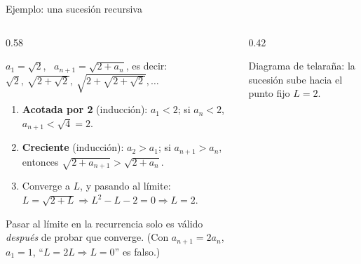 \documentclass[10pt,aspectratio=169]{beamer}
\begin{document}
\begin{frame}{Ejemplo: una sucesión recursiva}
  \begin{columns}
    \begin{column}{0.58\textwidth}
      \begin{ejemplo}
        $a_1=\sqrt2$, \ $a_{n+1}=\sqrt{2+a_n}$, es decir:\\
        $\sqrt2,\ \sqrt{2+\sqrt2},\ \sqrt{2+\sqrt{2+\sqrt2}},\dots$
        \begin{enumerate}
          \item \textbf{Acotada por 2} (inducción): $a_1<2$; si $a_n<2$, $a_{n+1}<\sqrt{4}=2$.
          \item \textbf{Creciente} (inducción): $a_2>a_1$; si $a_{n+1}>a_n$, entonces $\sqrt{2+a_{n+1}}>\sqrt{2+a_n}$.
          \item Converge a $L$, y pasando al límite: $L=\sqrt{2+L}\Rightarrow L^2-L-2=0\Rightarrow L=2$.
        \end{enumerate}
      \end{ejemplo}
      \begin{observacion}
        Pasar al límite en la recurrencia solo es válido \emph{después} de probar que converge.
        (Con $a_{n+1}=2a_n$, $a_1=1$, ``$L=2L\Rightarrow L=0$'' es falso.)
      \end{observacion}
    \end{column}
    \begin{column}{0.42\textwidth}
      \centering

      \small Diagrama de telaraña: la sucesión sube hacia el punto fijo $L=2$.
    \end{column}
  \end{columns}
\end{frame}
\end{document}
